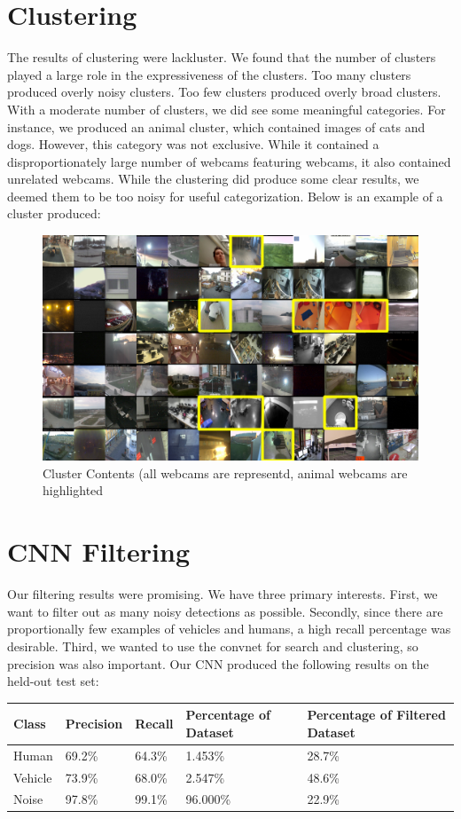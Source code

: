 \documentclass[10pt]{article} %
\begin{document}
\section{Clustering}
The results of clustering were lackluster. We found that the number of clusters
played a large role in the expressiveness of the clusters. Too many clusters
produced overly noisy clusters. Too few clusters produced overly broad
clusters. With a moderate number of clusters, we did see some meaningful
categories. For instance, we produced an animal cluster, which contained images
of cats and dogs. However, this category was not exclusive. While it contained
a disproportionately large number of webcams featuring webcams, it also
contained unrelated webcams. While the clustering did produce some clear
results, we deemed them to be too noisy for useful categorization. Below is an
example of a cluster produced:
\begin{figure}[H]
\centering
\caption{Cluster Contents (all webcams are representd, animal webcams are highlighted}
\includegraphics[scale = 0.2]{animals}
\end{figure}

\section{CNN Filtering}
Our filtering results were promising. We have three primary interests. First,
we want to filter out as many noisy detections as possible.  Secondly, since
there are proportionally few examples of vehicles and humans, a high recall
percentage was desirable. Third, we wanted to use the convnet for search and
clustering, so precision was also important. Our CNN produced the following
results on the held-out test set:
\begin{center}
  \begin{tabular}{ | m{5em} | m{5em}| m{5em} | m{9em} | m{13em} | } 
    \hline
    Class & Precision & Recall & Percentage of Dataset & Percentage of Filtered Dataset  \\ 
    \hline
    Human & 69.2\% & 64.3\% & 1.453\% & 28.7\%  \\ 
    \hline
    Vehicle & 73.9\%  & 68.0\% & 2.547\% & 48.6\% \\ 
    \hline
    Noise & 97.8\%  &99.1\% & 96.000\% & 22.9\%  \\ 
    \hline
  \end{tabular}
\end{center}
\end{document}
